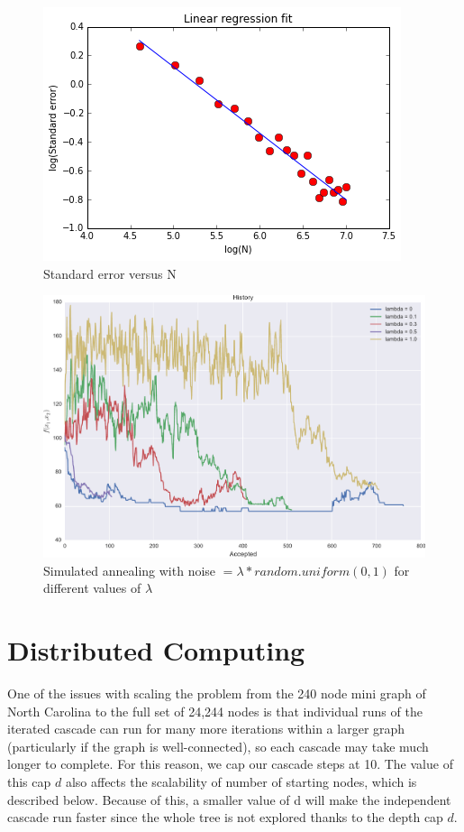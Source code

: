 \documentclass[11pt]{scrartcl} %
\begin{document}
\begin{figure}
\centering
\includegraphics[width=10 cm]{LinearR}
\caption{Standard error versus N}
\label{fig:LR}
\end{figure}
	 
\begin{figure}
\centering
\includegraphics[width=10 cm]{lambda01}
\caption{Simulated annealing with noise $= \lambda*random.uniform(0,1)$ for different values of $\lambda$}
\label{fig:SA}
\end{figure}
	 
\section{Distributed Computing}
One of the issues with scaling the problem from the 240 node mini graph of North Carolina to the full set of 24,244 nodes is that individual runs of the iterated cascade can run for many more iterations within a larger graph (particularly if the graph is well-connected), so each cascade may take much longer to complete.  For this reason, we cap our cascade steps at 10.  The value of this cap $d$ also affects the scalability of number of starting nodes, which is described below.  Because of this, a smaller value of d will make the independent cascade run faster since the whole tree is not explored thanks to the depth cap $d$. \\
\end{document}
